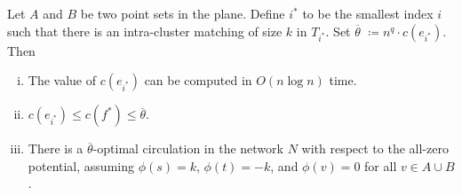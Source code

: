\documentclass[11pt]{article}
\def\fsupply{\phi}
\def\cost{c}
\theoremstyle{plain}
\numberwithin{figure}{section}
\def\EMPH#1{\textcolor{BrickRed}{{\emph{#1}}}}
\begin{document}
\begin{lemma}
\label{lemma:starting_scale}
Let $A$ and $B$ be two point sets in the plane.
Define \EMPH{$i^*$} to be the smallest index $i$ such that there is an
intra-cluster matching of size $k$ in $T_{i^*}$.
Set \EMPH{$\overline{\theta}$} $\coloneqq n^q \cdot c(e_{i^*})$.
Then
\begin{enumerate}[(i)]
\item \label{item:starting_scale1}
	The value of $c(e_{i^*})$ can be computed in $O(n\log n)$ time.
\item \label{item:starting_scale2}
	$c(e_{i^*}) \leq \cost(f^*) \leq \overline{\theta}$.
\item \label{item:starting_scale3}
	There is a $\overline{\theta}$-optimal circulation in the network $N$ with
	respect to the all-zero potential, assuming $\fsupply(s) = k$,
	$\fsupply(t) = -k$, and $\fsupply(v) = 0$ for all $v \in A \cup B$.
\end{enumerate}
\end{lemma}
\end{document}
